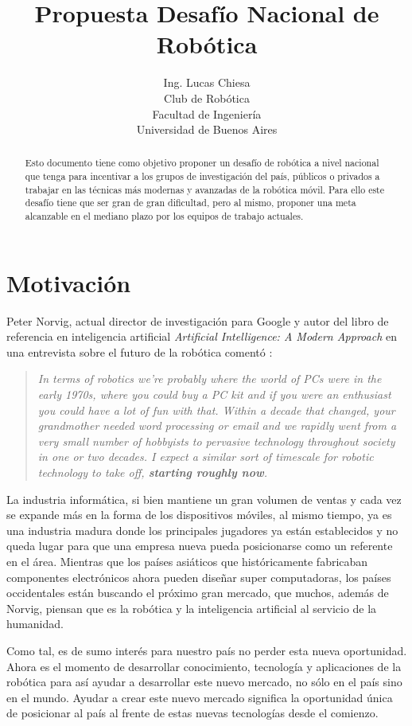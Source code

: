 \documentclass[a4paper,12pt]{article}
\author{Ing. Lucas Chiesa \\ Club de Robótica \\ Facultad de Ingeniería \\ Universidad de Buenos Aires}
\title{Propuesta Desafío Nacional de Robótica}
\begin{document}


\begin{abstract}
 Esto documento tiene como objetivo proponer un desafío de robótica a nivel nacional que tenga para incentivar a los grupos de investigación del país, públicos o privados a trabajar en las técnicas más modernas y avanzadas de la robótica móvil. Para ello este desafío tiene que ser gran de gran dificultad, pero al mismo, proponer una meta alcanzable en el mediano plazo por los equipos de trabajo actuales.
\end{abstract}

\newpage
\section{Motivación}

Peter Norvig\cite{norvig-cv}, actual director de investigación para Google y autor del libro de referencia en inteligencia artificial \textit{Artificial Intelligence: A Modern Approach} en una entrevista sobre el futuro de la robótica comentó \cite{norvig-cita}:

\begin{quote}
\textit{In terms of robotics we're probably where the world of PCs were in the early 1970s, where you could buy a PC kit and if you were an enthusiast you could have a lot of fun with that. Within a decade that changed, your grandmother needed word processing or email and we rapidly went from a very small number of hobbyists to pervasive technology throughout society in one or two decades. I expect a similar sort of timescale for robotic technology to take off, \textbf{starting roughly now}.}
\end{quote}

La industria informática, si bien mantiene un gran volumen de ventas y cada vez se expande más en la forma de los dispositivos móviles, al mismo tiempo, ya es una industria madura donde los principales jugadores ya están establecidos y no queda lugar para que una empresa nueva pueda posicionarse como un referente en el área. Mientras que los países asiáticos que históricamente fabricaban componentes electrónicos ahora pueden diseñar super computadoras\cite{spectrum-china}, los países occidentales están buscando el próximo gran mercado, que muchos, además de Norvig, piensan que es la robótica y la inteligencia artificial al servicio de la humanidad\cite{ros-spur}\cite{redwood}\cite{wg-irobot}.

Como tal, es de sumo interés para nuestro país no perder esta nueva oportunidad. Ahora es el momento de desarrollar conocimiento, tecnología y aplicaciones de la robótica para así ayudar a desarrollar este nuevo mercado, no sólo en el país sino en el mundo. Ayudar a crear este nuevo mercado significa la oportunidad única de posicionar al país al frente de estas nuevas tecnologías desde el comienzo.
 
\end{document}
